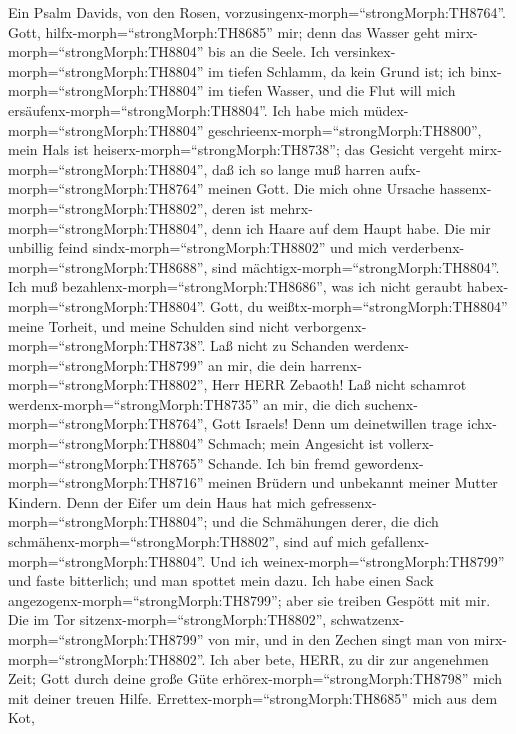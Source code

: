  Ein Psalm Davids, von den Rosen,
vorzusingenx-morph=``strongMorph:TH8764''. Gott,
hilfx-morph=``strongMorph:TH8685'' mir; denn das Wasser geht
mirx-morph=``strongMorph:TH8804'' bis an die Seele.  Ich
versinkex-morph=``strongMorph:TH8804'' im tiefen Schlamm, da kein Grund
ist; ich binx-morph=``strongMorph:TH8804'' im tiefen Wasser, und die
Flut will mich ersäufenx-morph=``strongMorph:TH8804''.  Ich
habe mich müdex-morph=``strongMorph:TH8804''
geschrieenx-morph=``strongMorph:TH8800'', mein Hals ist
heiserx-morph=``strongMorph:TH8738''; das Gesicht vergeht
mirx-morph=``strongMorph:TH8804'', daß ich so lange muß harren
aufx-morph=``strongMorph:TH8764'' meinen Gott.  Die mich
ohne Ursache hassenx-morph=``strongMorph:TH8802'', deren ist
mehrx-morph=``strongMorph:TH8804'', denn ich Haare auf dem Haupt habe.
Die mir unbillig feind sindx-morph=``strongMorph:TH8802'' und mich
verderbenx-morph=``strongMorph:TH8688'', sind
mächtigx-morph=``strongMorph:TH8804''. Ich muß
bezahlenx-morph=``strongMorph:TH8686'', was ich nicht geraubt
habex-morph=``strongMorph:TH8804''.  Gott, du
weißtx-morph=``strongMorph:TH8804'' meine Torheit, und meine Schulden
sind nicht verborgenx-morph=``strongMorph:TH8738''.  Laß
nicht zu Schanden werdenx-morph=``strongMorph:TH8799'' an mir, die dein
harrenx-morph=``strongMorph:TH8802'', Herr HERR Zebaoth! Laß nicht
schamrot werdenx-morph=``strongMorph:TH8735'' an mir, die dich
suchenx-morph=``strongMorph:TH8764'', Gott Israels!  Denn um
deinetwillen trage ichx-morph=``strongMorph:TH8804'' Schmach; mein
Angesicht ist vollerx-morph=``strongMorph:TH8765'' Schande. 
Ich bin fremd gewordenx-morph=``strongMorph:TH8716'' meinen Brüdern und
unbekannt meiner Mutter Kindern.  Denn der Eifer um dein
Haus hat mich gefressenx-morph=``strongMorph:TH8804''; und die
Schmähungen derer, die dich schmähenx-morph=``strongMorph:TH8802'', sind
auf mich gefallenx-morph=``strongMorph:TH8804''.  Und ich
weinex-morph=``strongMorph:TH8799'' und faste bitterlich; und man
spottet mein dazu.  Ich habe einen Sack
angezogenx-morph=``strongMorph:TH8799''; aber sie treiben Gespött mit
mir.  Die im Tor sitzenx-morph=``strongMorph:TH8802'',
schwatzenx-morph=``strongMorph:TH8799'' von mir, und in den Zechen singt
man von mirx-morph=``strongMorph:TH8802''.  Ich aber bete,
HERR, zu dir zur angenehmen Zeit; Gott durch deine große Güte
erhörex-morph=``strongMorph:TH8798'' mich mit deiner treuen Hilfe.
 Errettex-morph=``strongMorph:TH8685'' mich aus dem Kot,
